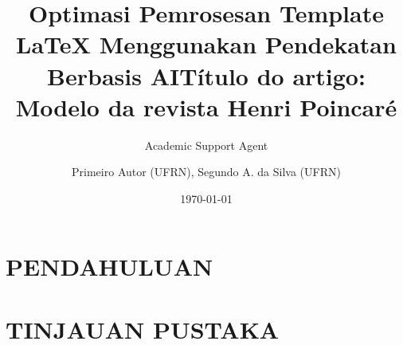 \documentclass{article}
\title{Optimasi Pemrosesan Template LaTeX Menggunakan Pendekatan Berbasis AI}
\author{Academic Support Agent}
\date{\today}
\begin{document}
\maketitle

\begin{abstract}

\end{abstract}

\chapter{PENDAHULUAN}


\chapter{TINJAUAN PUSTAKA}



\usepackage{sbc-template}
\usepackage{graphicx,url}
\usepackage[brazil]{babel}   
\usepackage[utf8]{inputenc}  
\usepackage{verbatim}
\usepackage{listings}
\usepackage{indentfirst}






\sloppy

\title{Título do artigo: Modelo da revista Henri Poincaré}

\author{Primeiro Autor (UFRN), Segundo A. da Silva (UFRN)}

\address{emailautor1@gmail.com emailautor2@hotmail.com;
}
\end{document}
